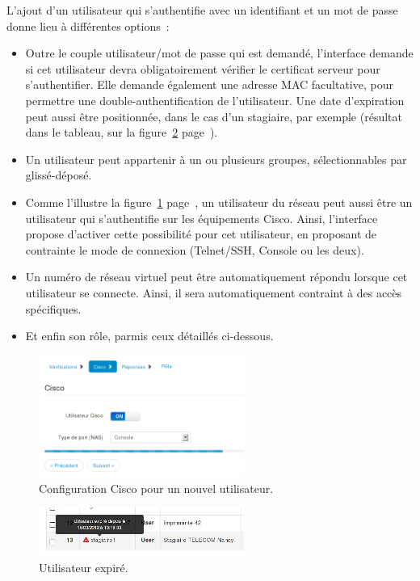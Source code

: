 L'ajout d'un utilisateur qui s'authentifie avec un identifiant et un mot de passe donne lieu à différentes options~:

\begin{itemize}
\item Outre le couple utilisateur/mot de passe qui est demandé, l'interface demande si cet utilisateur devra obligatoirement vérifier le certificat serveur pour s'authentifier. Elle demande également une adresse MAC facultative, pour permettre une double-authentification de l'utilisateur. Une date d'expiration peut aussi être positionnée, dans le cas d'un stagiaire, par exemple (résultat dans le tableau, sur la figure~\ref{usersexp} page~\pageref{usersexp}).
\item Un utilisateur peut appartenir à un ou plusieurs groupes, sélectionnables par glissé-déposé.
\item Comme l'illustre la figure~\ref{userscisco} page~\pageref{userscisco}, un utilisateur du réseau peut aussi être un utilisateur qui s'authentifie sur les équipements Cisco. Ainsi, l'interface propose d'activer cette possibilité pour cet utilisateur, en proposant de contrainte le mode de connexion (Telnet/SSH, Console ou les deux).
\item Un numéro de réseau virtuel peut être automatiquement répondu lorsque cet utilisateur se connecte. Ainsi, il sera automatiquement contraint à des accès spécifiques.
\item Et enfin son rôle, parmis ceux détaillés ci-dessous.
\end{itemize}

\begin{figure}[!h]
	\begin{center}
	    \includegraphics[width=0.6\textwidth]{img/userscisco.png}
	\end{center}
	\caption{Configuration Cisco pour un nouvel utilisateur.}
	\label{userscisco}
\end{figure}

\begin{figure}[!h]
	\begin{center}
	    \includegraphics[width=0.6\textwidth]{img/usersexp.png}
	\end{center}
	\caption{Utilisateur expiré.}
	\label{usersexp}
\end{figure}

